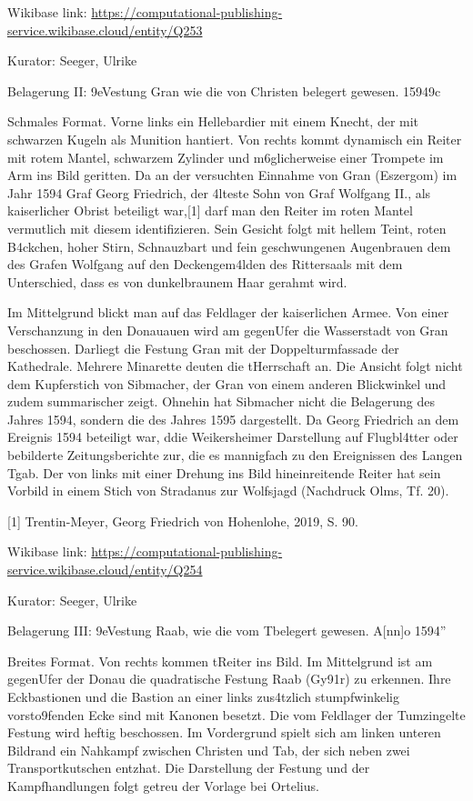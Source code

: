 \documentclass[
  letterpaper,
]{book}
\begin{document}
Wikibase link:
\url{https://computational-publishing-service.wikibase.cloud/entity/Q253}

Kurator: Seeger, Ulrike

Belagerung II: \x9eVestung Gran wie die von Christen belegert
gewesen. 1594\x9c

Schmales Format. Vorne links ein Hellebardier mit einem Knecht, der mit
schwarzen Kugeln als Munition hantiert. Von rechts kommt dynamisch ein
Reiter mit rotem Mantel, schwarzem Zylinder und m\xb6glicherweise
einer Trompete im Arm ins Bild geritten. Da an der versuchten Einnahme
von Gran (Eszergom) im Jahr 1594 Graf Georg Friedrich, der
\xa4lteste Sohn von Graf Wolfgang II., als kaiserlicher Obrist
beteiligt war,{[}1{]} darf man den Reiter im roten Mantel vermutlich mit
diesem identifizieren. Sein Gesicht folgt mit hellem Teint, roten
B\xa4ckchen, hoher Stirn, Schnauzbart und fein geschwungenen
Augenbrauen dem des Grafen Wolfgang auf den Deckengem\xa4lden des
Rittersaals mit dem Unterschied, dass es von dunkelbraunem Haar gerahmt
wird.

Im Mittelgrund blickt man auf das Feldlager der kaiserlichen Armee. Von
einer Verschanzung in den Donauauen wird am
gegen\xbcberliegenden Ufer die Wasserstadt von Gran beschossen.
Dar\xbcber liegt die Festung Gran mit der Doppelturmfassade der
Kathedrale. Mehrere Minarette deuten die t\xbcrkische Herrschaft an.
Die Ansicht folgt nicht dem Kupferstich von Sibmacher, der Gran von
einem anderen Blickwinkel und zudem summarischer zeigt. Ohnehin hat
Sibmacher nicht die Belagerung des Jahres 1594, sondern die des Jahres
1595 dargestellt. Da Georg Friedrich an dem Ereignis 1594 beteiligt war,
d\xbcrfte die Weikersheimer Darstellung auf Flugbl\xa4tter oder
bebilderte Zeitungsberichte zur\xbcckgehen, die es mannigfach zu den
Ereignissen des Langen T\xbcrkenkriegs gab. Der von links mit einer
Drehung ins Bild hineinreitende Reiter hat sein Vorbild in einem Stich
von Stradanus zur Wolfsjagd (Nachdruck Olms, Tf. 20).

{[}1{]} Trentin-Meyer, Georg Friedrich von Hohenlohe, 2019, S. 90.

Wikibase link:
\url{https://computational-publishing-service.wikibase.cloud/entity/Q254}

Kurator: Seeger, Ulrike

Belagerung III: \x9eVestung Raab, wie die vom
T\xbcrcken belegert gewesen. A{[}nn{]}o 1594''

Breites Format. Von rechts kommen t\xbcrkische Reiter ins Bild. Im
Mittelgrund ist am gegen\xbcberliegenden Ufer der Donau die
quadratische Festung Raab (Gy\x91r) zu erkennen. Ihre Eckbastionen
und die Bastion an einer links zus\xa4tzlich stumpfwinkelig
vorsto\x9fenden Ecke sind mit Kanonen besetzt. Die vom Feldlager der
T\xbcrken umzingelte Festung wird heftig beschossen. Im Vordergrund
spielt sich am linken unteren Bildrand ein Nahkampf zwischen Christen
und T\xbcrken ab, der sich neben zwei Transportkutschen
entz\xbcndet hat. Die Darstellung der Festung und der
Kampfhandlungen folgt getreu der Vorlage bei Ortelius.
\end{document}
